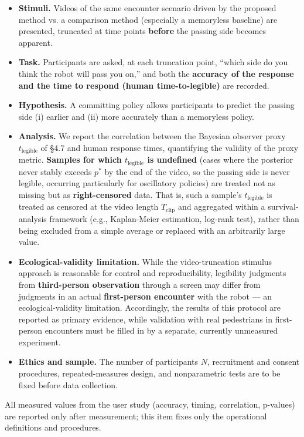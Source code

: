 \documentclass[11pt]{article}
\begin{document}
\begin{itemize}
\item \textbf{Stimuli.} Videos of the same encounter scenario driven by the proposed method vs. a comparison method (especially a memoryless baseline) are presented, truncated at time points \textbf{before} the passing side becomes apparent.
\item \textbf{Task.} Participants are asked, at each truncation point, ``which side do you think the robot will pass you on,'' and both the \textbf{accuracy of the response and the time to respond (human time-to-legible)} are recorded.
\item \textbf{Hypothesis.} A committing policy allows participants to predict the passing side (i) earlier and (ii) more accurately than a memoryless policy.
\item \textbf{Analysis.} We report the correlation between the Bayesian observer proxy $t_{\text{legible}}$ of \S4.7 and human response times, quantifying the validity of the proxy metric. \textbf{Samples for which $t_{\text{legible}}$ is undefined} (cases where the posterior never stably exceeds $p^*$ by the end of the video, so the passing side is never legible, occurring particularly for oscillatory policies) are treated not as missing but as \textbf{right-censored} data. That is, such a sample's $t_{\text{legible}}$ is treated as censored at the video length $T_{\text{clip}}$ and aggregated within a survival-analysis framework (e.g., Kaplan-Meier estimation, log-rank test), rather than being excluded from a simple average or replaced with an arbitrarily large value.
\item \textbf{Ecological-validity limitation.} While the video-truncation stimulus approach is reasonable for control and reproducibility, legibility judgments from \textbf{third-person observation} through a screen may differ from judgments in an actual \textbf{first-person encounter} with the robot --- an ecological-validity limitation. Accordingly, the results of this protocol are reported as primary evidence, while validation with real pedestrians in first-person encounters must be filled in by a separate, currently unmeasured experiment.
\item \textbf{Ethics and sample.} The number of participants $N$, recruitment and consent procedures, repeated-measures design, and nonparametric tests are to be fixed before data collection.
\end{itemize}

All measured values from the user study (accuracy, timing, correlation, p-values) are reported only after measurement; this item fixes only the operational definitions and procedures.
\end{document}
